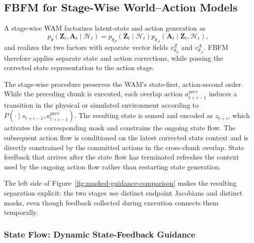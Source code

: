 \subsection{FBFM for Stage-Wise World--Action Models}
\label{sec:method:stage-wise}

A stage-wise WAM factorizes latent-state and action generation as
\begin{equation}
    p_\theta(\mathbf Z_t,\mathbf A_t\mid\mathcal H_t)
    =
    p_{\theta_Z}(\mathbf Z_t\mid\mathcal H_t)
    p_{\theta_A}(\mathbf A_t\mid\mathbf Z_t,\mathcal H_t),
    \label{eq:stage-wise-factorization}
\end{equation}
and realizes the two factors with separate vector fields $v_{\theta_Z}^Z$ and
$v_{\theta_A}^A$. FBFM therefore applies separate state and action corrections,
while passing the corrected state representation to the action stage.

The stage-wise procedure preserves the WAM's state-first, action-second order.
While the preceding chunk is executed, each overlap action
$a_{t+i-1}^{\mathrm{prev}}$ induces a transition in the physical or simulated
environment according to $P(\cdot\mid s_{t+i-1},a_{t+i-1}^{\mathrm{prev}})$. The
resulting state is sensed and encoded as $z_{t+i}$, which activates the
corresponding mask and constrains the ongoing state flow. The subsequent action
flow is conditioned on the latest corrected state context and is directly
constrained by the committed actions in the cross-chunk overlap. State feedback
that arrives after the state flow has terminated refreshes the context used by the
ongoing action flow rather than restarting state generation.

The left side of Figure~\ref{fig:masked-guidance-comparison} makes the resulting
separation explicit: the two stages use distinct endpoint Jacobians and distinct
masks, even though feedback collected during execution connects them temporally.

\subsubsection{State Flow: Dynamic State-Feedback Guidance}

